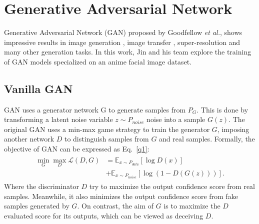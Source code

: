 \documentclass[10pt,twocolumn,letterpaper]{article}
\begin{document}
\section{Generative Adversarial Network}

Generative Adversarial Network (GAN) \cite{Goodfellow2014Generative} proposed by Goodfellow \emph{et al.}, shows impressive results in image generation \cite{Radford2015Unsupervised}, image transfer \cite{Isola2016Image}, super-resolution \cite{Ledig2017Photo} and many other generation tasks. In this work, Jin and his team explore the training of GAN models specialized on an anime facial image dataset.

\begin{table*}
	\caption{Number of dataset images for each tag.}\label{t1}
	\begin{center}
		\end{center}
	\end{table*}


\subsection{Vanilla GAN}

GAN uses a generator network G to generate samples from $P_G$. This is done by transforming a latent noise variable $z\sim P_{noise}$ noise into a sample $G(z)$. The original GAN uses a min-max game strategy to train the generator $G$, imposing another network $D$ to distinguish samples from $G$ and real samples. Formally, the objective of GAN can be expressed as Eq.~\ref{q1}:
\begin{equation}
\begin{aligned}
\begin{split}
\min_G \max_D \mathcal{L}(D,G)&=\mathbb{E}_{x\sim P_{data}}[\log D(x)]\\
&+\mathbb{E}_{x\sim P_{noise}}[\log (1-D(G(z)))].
\label{q1}
\end{split}
\end{aligned}
\end{equation}
Where the discriminator $D$ try to maximize the output confidence score from real samples. Meanwhile, it also minimizes the output confidence score from fake samples generated by $G$. On contrast, the aim of $G$ is to maximize the $D$ evaluated score for its outputs, which can be viewed as deceiving $D$.
\end{document}
